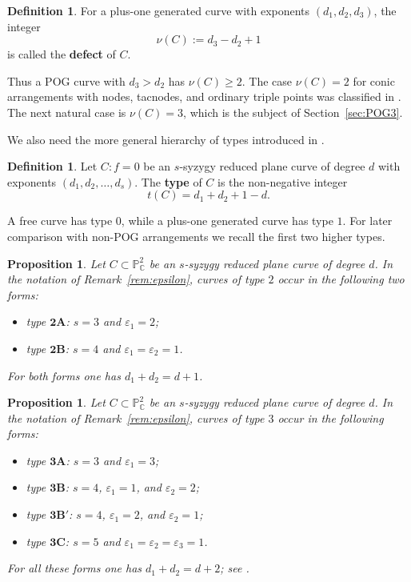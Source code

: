 \documentclass[11pt]{article}
\theoremstyle{plain}
\newtheorem{proposition}[thm]{Proposition}
\theoremstyle{definition}
\newtheorem{definition}[thm]{Definition}
\begin{document}
\begin{definition}
For a plus-one generated curve with exponents $(d_1,d_2,d_3)$, the integer
\[
\nu(C):=d_3-d_2+1
\]
is called the \textbf{defect} of $C$.
\end{definition}

Thus a POG curve with $d_3>d_2$ has $\nu(C)\geq2$. The case $\nu(C)=2$ for conic arrangements with nodes, tacnodes, and ordinary triple points was classified in \cite[Theorem 3.1]{MP24}. The next natural case is $\nu(C)=3$, which is the subject of Section~\ref{sec:POG3}.

We also need the more general hierarchy of types introduced in \cite{NewH}.

\begin{definition}
Let $C:f=0$ be an $s$-syzygy reduced plane curve of degree $d$ with exponents $(d_1,d_2,\ldots,d_s)$. The \textbf{type} of $C$ is the non-negative integer
\[
t(C)=d_1+d_2+1-d.
\]
\end{definition}

A free curve has type $0$, while a plus-one generated curve has type $1$. For later comparison with non-POG arrangements we recall the first two higher types.

\begin{proposition} \label{prop:typ2}
Let $C\subset \mathbb P^2_{\mathbb C}$ be an $s$-syzygy reduced plane curve of degree $d$. In the notation of Remark~\ref{rem:epsilon}, curves of type $2$ occur in the following two forms:
\begin{itemize}
\item type $\mathbf{2A}$: $s=3$ and $\varepsilon_1=2$;
\item type $\mathbf{2B}$: $s=4$ and $\varepsilon_1=\varepsilon_2=1$.
\end{itemize}
For both forms one has $d_1+d_2=d+1$.
\end{proposition}

\begin{proposition} \label{prop:typ3}
Let $C\subset \mathbb P^2_{\mathbb C}$ be an $s$-syzygy reduced plane curve of degree $d$. In the notation of Remark~\ref{rem:epsilon}, curves of type $3$ occur in the following forms:
\begin{itemize}
\item type $\mathbf{3A}$: $s=3$ and $\varepsilon_1=3$;
\item type $\mathbf{3B}$: $s=4$, $\varepsilon_1=1$, and $\varepsilon_2=2$;
\item type $\mathbf{3B'}$: $s=4$, $\varepsilon_1=2$, and $\varepsilon_2=1$;
\item type $\mathbf{3C}$: $s=5$ and $\varepsilon_1=\varepsilon_2=\varepsilon_3=1$.
\end{itemize}
For all these forms one has $d_1+d_2=d+2$; see \cite{typ3}.
\end{proposition}
\end{document}
